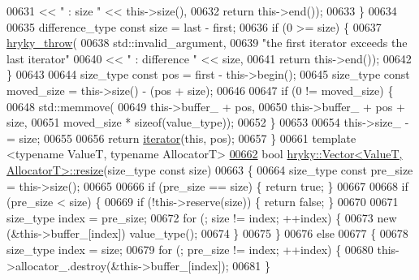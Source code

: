 \begin{DoxyCode}
00631             << \textcolor{stringliteral}{" : size "} << this->size(),
00632             \textcolor{keywordflow}{return} this->end());
00633     \}
00634 
00635     difference\_type \textcolor{keyword}{const} size = last - first;
00636     \textcolor{keywordflow}{if} (0 >= size) \{
00637         \hyperlink{debug__common_8h_af50606eac4009921527ddcaed392b2c2}{hryky_throw}(
00638             std::invalid\_argument,
00639             \textcolor{stringliteral}{"the first iterator exceeds the last iterator"}
00640             << \textcolor{stringliteral}{" : difference "} << size,
00641             \textcolor{keywordflow}{return} this->end());
00642     \}
00643 
00644     size\_type \textcolor{keyword}{const} pos         = first - this->begin();
00645     size\_type \textcolor{keyword}{const} moved\_size  = this->size() - (pos + size);
00646 
00647     \textcolor{keywordflow}{if} (0 != moved\_size) \{
00648         std::memmove(
00649             this->buffer\_ + pos,
00650             this->buffer\_ + pos + size,
00651             moved\_size * \textcolor{keyword}{sizeof}(value\_type));
00652     \}
00653 
00654     this->size\_ -= size;
00655 
00656     \textcolor{keywordflow}{return} \hyperlink{classhryky_1_1iterator_1_1random_1_1_mutable}{iterator}(\textcolor{keyword}{this}, pos);
00657 \}
00661 \textcolor{keyword}{template} <\textcolor{keyword}{typename} ValueT, \textcolor{keyword}{typename} AllocatorT>
\hypertarget{vector_8h_source_l00662}{}\hyperlink{classhryky_1_1_vector_a9148eb8972b43ed3a7e807d19be848a5}{00662} \textcolor{keywordtype}{bool} \hyperlink{classhryky_1_1_vector}{hryky::Vector<ValueT, AllocatorT>::resize}(size\_type \textcolor{keyword}{const} size)
00663 \{
00664     size\_type \textcolor{keyword}{const} pre\_size = this->size();
00665     
00666     \textcolor{keywordflow}{if} (pre\_size == size) \{ \textcolor{keywordflow}{return} \textcolor{keyword}{true}; \}
00667 
00668     \textcolor{keywordflow}{if} (pre\_size < size) \{
00669         \textcolor{keywordflow}{if} (!this->reserve(size)) \{ \textcolor{keywordflow}{return} \textcolor{keyword}{false}; \}
00670 
00671         size\_type index = pre\_size;
00672         \textcolor{keywordflow}{for} (; size != index; ++index) \{
00673             \textcolor{keyword}{new} (&this->buffer\_[index]) value\_type();
00674         \}
00675     \}
00676     \textcolor{keywordflow}{else}
00677     \{
00678         size\_type index = size;
00679         \textcolor{keywordflow}{for} (; pre\_size != index; ++index) \{
00680             this->allocator\_.destroy(&this->buffer\_[index]);
00681         \}

\end{DoxyCode}
